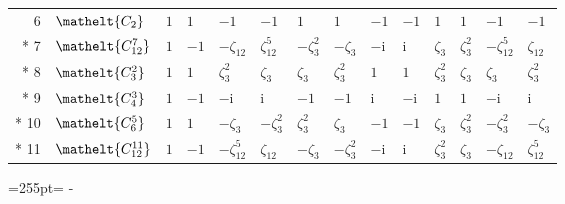 \documentclass[10pt,a4paper]{article}
\newcommand{\needspace}[1]{\par\penalty-100\begingroup\dimen0=#1\relax\dimen2=\pagegoal
  \advance\dimen2-\pagetotal\ifdim\dimen0>\dimen2\relax\ifdim\dimen2>0pt\vfil\break\fi\fi
  \endgroup}
\numberwithin{equation}{section}
\newcommand{\eltfont}[1]{{\let\sigma\eltsigma\mathelt{#1}}}
\newcommand{\cls}[1]{\eltfont{#1}}
\newcommand{\iunit}{\mathrm{i}}
\newcommand{\rootunity}[1]{\zeta_{#1}}
\begin{document}
{\begin{longtable}{@{}rlllllllllllll@{}}
6 & $\cls{C_{2}}$ & $1$ & $1$ & $-1$ & $-1$ & $1$ & $1$ & $-1$ & $-1$ & $1$ & $1$ & $-1$ & $-1$\\*
7 & $\cls{C_{12}^{7}}$ & $1$ & $-1$ & $-\rootunity{12}$ & $\rootunity{12}^{5}$ & $-\rootunity{3}^{2}$ & $-\rootunity{3}$ & $-\iunit{}$ & $\iunit{}$ & $\rootunity{3}$ & $\rootunity{3}^{2}$ & $-\rootunity{12}^{5}$ & $\rootunity{12}$\\*
8 & $\cls{C_{3}^{2}}$ & $1$ & $1$ & $\rootunity{3}^{2}$ & $\rootunity{3}$ & $\rootunity{3}$ & $\rootunity{3}^{2}$ & $1$ & $1$ & $\rootunity{3}^{2}$ & $\rootunity{3}$ & $\rootunity{3}$ & $\rootunity{3}^{2}$\\*
9 & $\cls{C_{4}^{3}}$ & $1$ & $-1$ & $-\iunit{}$ & $\iunit{}$ & $-1$ & $-1$ & $\iunit{}$ & $-\iunit{}$ & $1$ & $1$ & $-\iunit{}$ & $\iunit{}$\\*
10 & $\cls{C_{6}^{5}}$ & $1$ & $1$ & $-\rootunity{3}$ & $-\rootunity{3}^{2}$ & $\rootunity{3}^{2}$ & $\rootunity{3}$ & $-1$ & $-1$ & $\rootunity{3}$ & $\rootunity{3}^{2}$ & $-\rootunity{3}^{2}$ & $-\rootunity{3}$\\*
11 & $\cls{C_{12}^{11}}$ & $1$ & $-1$ & $-\rootunity{12}^{5}$ & $\rootunity{12}$ & $-\rootunity{3}$ & $-\rootunity{3}^{2}$ & $-\iunit{}$ & $\iunit{}$ & $\rootunity{3}^{2}$ & $\rootunity{3}$ & $-\rootunity{12}$ & $\rootunity{12}^{5}$\\
\bottomrule\end{longtable}}
\needspace{255pt}
\end{document}
